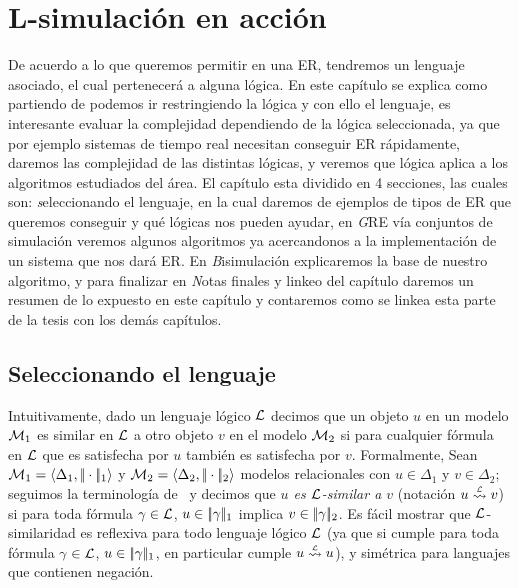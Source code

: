 \chapter{L-simulaci\'on en acci\'on}
\label{sec:intro_logica}

De acuerdo a lo que queremos permitir en una ER, tendremos un lenguaje asociado, el cual pertenecer\'a a alguna l\'ogica. En este cap\'itulo se explica como partiendo de \FOL podemos ir restringiendo la l\'ogica y con ello el lenguaje, es interesante evaluar la complejidad dependiendo de la l\'ogica seleccionada, ya que por ejemplo sistemas de tiempo real necesitan conseguir ER r\'apidamente, daremos las complejidad de las distintas l\'ogicas, y veremos que l\'ogica aplica a los algoritmos estudiados del \'area.
El cap\'itulo esta dividido en 4 secciones, las cuales son: {\emph seleccionando el lenguaje}, en la cual daremos de ejemplos de tipos de ER que queremos conseguir y qu\'e l\'ogicas nos pueden ayudar, en {\emph GRE v\'ia conjuntos de simulaci\'on} veremos algunos algoritmos ya acercandonos a la implementaci\'on de un sistema que nos dar\'a ER. En {\emph Bisimulaci\'on} explicaremos la base de nuestro algoritmo, y para finalizar en {\emph Notas finales y linkeo del cap\'itulo} daremos un resumen de lo expuesto en este cap\'itulo y contaremos como se linkea esta parte de la tesis con los dem\'as cap\'itulos.


\section{Seleccionando el lenguaje}

Intuitivamente, dado un lenguaje l\'ogico $\mathcal{L}$ decimos que un objeto $u$ en un modelo
$\mathcal{M}_1$ es similar en $\mathcal{L}$ a otro objeto
 $v$ en el modelo $\mathcal{M}_2$ si para cualquier f\'ormula en $\mathcal{L}$ que es satisfecha por $u$ tambi\'en es satisfecha por $v$. Formalmente,
Sean $\mathcal{M}_1 = \langle \Delta_1, |\!|\cdot|\!|_1 \rangle$ y $\mathcal{M}_2 = \langle \Delta_2, |\!|\cdot|\!|_2 \rangle$ modelos relacionales con $u \in \Delta_1$ y $v \in \Delta_2$; seguimos la terminolog\'ia de~\cite{areces08} y decimos que
\emph{$u$ es $\mathcal{L}$-similar a $v$}  (notaci\'on $u \simil{\+L} v$) si para toda f\'ormula $\gamma \in \mathcal{L}$, $u \in |\!|\gamma|\!|_1$ implica
$v \in |\!|\gamma|\!|_2$. Es f\'acil mostrar que
$\mathcal{L}$-similaridad es reflexiva para todo lenguaje l\'ogico $\mathcal{L}$ (ya que si cumple para toda f\'ormula $\gamma \in \mathcal{L}$, $u \in |\!|\gamma|\!|_1$, en particular cumple $u \simil{\+L} u$), y sim\'etrica  para languajes que contienen negaci\'on.


